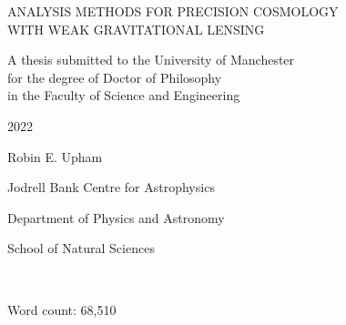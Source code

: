 % 
% 


\begin{titlepage}

\centering


\vspace*{8em} %

\begingroup
\fontsize{16pt}{20pt}\selectfont
\uppercase{Analysis methods for precision cosmology\\[1em]
with weak gravitational lensing}
\endgroup

\begingroup
\fontsize{12pt}{18pt}\selectfont

\vspace{10em}

A thesis submitted to the University of Manchester\\
for the degree of Doctor of Philosophy\\
in the Faculty of Science and Engineering

\vspace{3em}

2022

\vspace{3em}

Robin E. Upham

\vspace{3em}

Jodrell Bank Centre for Astrophysics

Department of Physics and Astronomy

School of Natural Sciences

\endgroup

\end{titlepage}

\renewcommand*\contentsname{Table of contents}
\tableofcontents

~

Word count: 68,510




